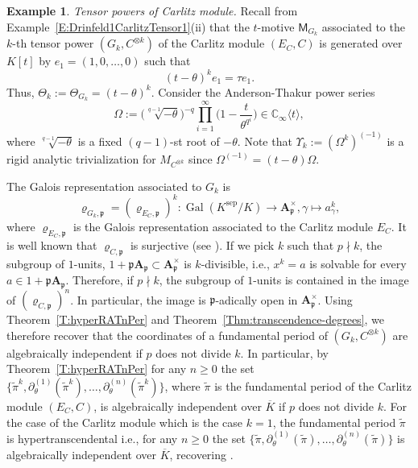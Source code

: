 \documentclass[10pt,a4paper]{amsart}
\theoremstyle{plain} %
\theoremstyle{definition}
\newtheorem{Example}[Theorem]{Example}
\theoremstyle{remark}
\newcommand{\CC}{\mathbb{C}}
\newcommand{\fp}{\mathfrak{p}}  %
\newcommand{\bA}{\mathbf{A}}
\newcommand{\oK}{\overline{K}}
\newcommand{\Gal}{\operatorname{Gal}}
\newcommand{\mot}{\mathsf{M}}  %
\newcommand{\sep}{\mathrm{sep}}
\newcommand{\hde}[1]{\partial^{(#1)}}  %
\numberwithin{equation}{subsection}
\begin{document}
\begin{Example}
\emph{Tensor powers of Carlitz module.} Recall from Example~\ref{E:Drinfeld1CarlitzTensor1}(ii) that the $t$-motive $\mot_{G_k}$ associated to the $k$-th tensor power $(G_k,C^{\otimes k})$ of the Carlitz module $(E_C,C)$ is generated over $K[t]$ by $e_1=(1,0, \dots, 0)$ such that
\begin{equation}\label{E:Cntaut1}
(t-\theta)^k e_1 = \tau e_1. 
\end{equation}
Thus, $\Theta_k:=\Theta_{G_k} = (t-\theta)^k$. Consider the Anderson-Thakur power series 
\[
\Omega := \big(\sqrt[q-1]{-\theta}\big)^{-q} \prod_{i=1}^\infty \bigg(1-\dfrac{t}{\theta^{q^i}}\bigg) \in \CC_\infty \langle t \rangle,
\]
where $\sqrt[q-1]{-\theta}$ is a fixed $(q-1)$-st root of $-\theta$. 
Note that $\Upsilon_k:=(\Omega^k)^{(-1)}$ is a rigid analytic trivialization for $M_{C^{\otimes k}}$ since $\Omega^{(-1)} = (t-\theta)\Omega$.


The Galois representation associated to $G_k$ is 
\[\varrho_{G_k,\fp}=(\varrho_{E_C,\fp})^k:\Gal(K^\sep/K)\to \bA_\fp^\times, \gamma\mapsto a_\gamma^k,
\]
where
$\varrho_{E_C,\fp}$ is the Galois representation associated to the Carlitz module $E_C$. It is well known 
that 
$\varrho_{C,\fp}$ is surjective (see \cite[Proposition 12.7]{mr:ntff}). If we pick $k$ such that $p\nmid k$, the subgroup of $1$-units, $1+\fp \bA_\fp\subset \bA_\fp^\times$ is $k$-divisible, i.e., $x^k=a$ is solvable for every $a\in 1+\fp \bA_\fp$.
Therefore, if $p\nmid k$, the subgroup of $1$-units is contained in the image of $(\varrho_{C,\fp})^n$. In particular, the image is $\fp$-adically open in $\bA_\fp^\times$. Using Theorem~\ref{T:hyperRATnPer} and Theorem~\ref{Thm:transcendence-degrees}, we therefore recover \cite[Theorem 8.1]{am:ptmaip} that the coordinates of a fundamental period of $(G_k,C^{\otimes k})$ are algebraically independent if $p$ does not divide $k$. In particular, by Theorem~\ref{T:hyperRATnPer} for any $n\geq 0$ the set $\{\widetilde{\pi}^k, \hde{1}_{\theta}(\widetilde{\pi}^k), \dots, \hde{n}_{\theta}(\widetilde{\pi}^k)\}$, where $\widetilde{\pi}$ is the fundamental period of the Carlitz module $(E_C,C)$,  is algebraically independent over $\oK$ if $p$ does not divide $k$. For the case of the Carlitz module which is the case $k=1$, the fundamental period $\widetilde{\pi}$ is hypertranscendental i.e., for any $n\geq 0$ the set $\{\widetilde{\pi}, \hde{1}_{\theta}(\widetilde{\pi}), \dots, \hde{n}_{\theta}(\widetilde{\pi})\}$ is algebraically independent over $\oK$, recovering \cite[Theorem 2.1]{am:aicph}.
\end{Example}
\end{document}
